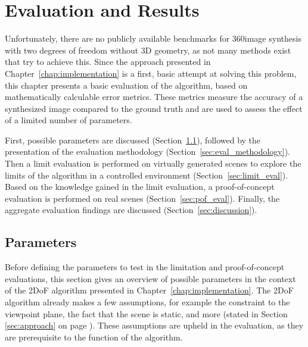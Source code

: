 \chapter{Evaluation and Results} \label{chap:evaluation}
Unfortunately, there are no publicly available benchmarks for 360\degree image synthesis with two degrees of freedom without 3D geometry, as not many methods exist that try to achieve this. Since the approach presented in Chapter~\ref{chap:implementation} is a first, basic attempt at solving this problem, this chapter presents a basic evaluation of the algorithm, based on mathematically calculable error metrics. These metrics measure the accuracy of a synthesized image compared to the ground truth and are used to assess the effect of a limited number of parameters.

First, possible parameters are discussed (Section~\ref{sec:params}), followed by the presentation of the evaluation methodology (Section~\ref{sec:eval_methodology}). Then a limit evaluation is performed on virtually generated scenes to explore the limits of the algorithm in a controlled environment (Section~\ref{sec:limit_eval}). Based on the knowledge gained in the limit evaluation, a proof-of-concept evaluation is performed on real scenes (Section~\ref{sec:pof_eval}). Finally, the aggregate evaluation findings are discussed (Section~\ref{sec:discussion}).



\section{Parameters} \label{sec:params}
Before defining the parameters to test in the limitation and proof-of-concept evaluations, this section gives an overview of possible parameters in the context of the 2DoF algorithm presented in Chapter~\ref{chap:implementation}.
The 2DoF algorithm already makes a few assumptions, for example the constraint to the viewpoint plane, the fact that the scene is static, and more (stated in Section \ref{sec:approach} on page \pageref{sec:approach}). These assumptions are upheld in the evaluation, as they are prerequisite to the function of the algorithm.

